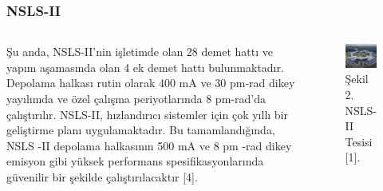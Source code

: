 \documentclass[aspectratio=169,10pt]{beamer}
\begin{document}
\begin{frame}[allowframebreaks]
\frametitle{NSLS-II}

\begin{columns}

Şu anda, NSLS-II'nin işletimde olan 28 demet hattı ve yapım aşamasında olan 4 ek demet hattı bulunmaktadır. Depolama halkası rutin olarak 400 mA ve 30 pm-rad dikey yayılımda ve özel çalışma periyotlarında 8 pm-rad'da çalıştırılır. NSLS-II, hızlandırıcı sistemler için çok yıllı bir geliştirme planı uygulamaktadır. Bu tamamlandığında, NSLS -II depolama halkasının 500 mA ve 8 pm -rad dikey emisyon gibi yüksek performans spesifikasyonlarında güvenilir bir şekilde çalıştırılacaktır [4]. 
 
\centering
 \begin{figure}
\includegraphics[width=7cm]{39344406832_b5a2641959_k.jpg}
\caption*{
\centering 
Şekil 2. NSLS-II Tesisi [1].}
	\end{figure}
	\end{columns}

\end{frame}
\end{document}
